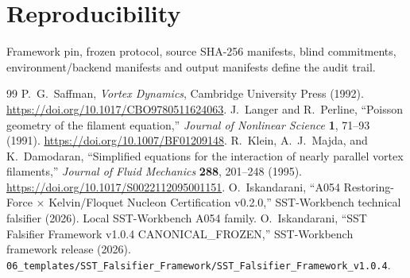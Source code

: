 \documentclass[11pt]{article}
\begin{document}
\section{Reproducibility} Framework pin, frozen protocol, source SHA-256 manifests, blind commitments, environment/backend manifests and output manifests define the audit trail.
\begin{thebibliography}{99}
 P.~G.~Saffman, \emph{Vortex Dynamics}, Cambridge University Press (1992). \url{https://doi.org/10.1017/CBO9780511624063}.
 J.~Langer and R.~Perline, ``Poisson geometry of the filament equation,'' \emph{Journal of Nonlinear Science} \textbf{1}, 71--93 (1991). \url{https://doi.org/10.1007/BF01209148}.
 R.~Klein, A.~J.~Majda, and K.~Damodaran, ``Simplified equations for the interaction of nearly parallel vortex filaments,'' \emph{Journal of Fluid Mechanics} \textbf{288}, 201--248 (1995). \url{https://doi.org/10.1017/S0022112095001151}.
 O.~Iskandarani, ``A054 Restoring-Force $\times$ Kelvin/Floquet Nucleon Certification v0.2.0,'' SST-Workbench technical falsifier (2026). Local SST-Workbench A054 family.
 O.~Iskandarani, ``SST Falsifier Framework v1.0.4 CANONICAL\_FROZEN,'' SST-Workbench framework release (2026). \texttt{06\_templates/SST\_Falsifier\_Framework/SST\_Falsifier\_Framework\_v1.0.4}.
\end{thebibliography}
\end{document}
